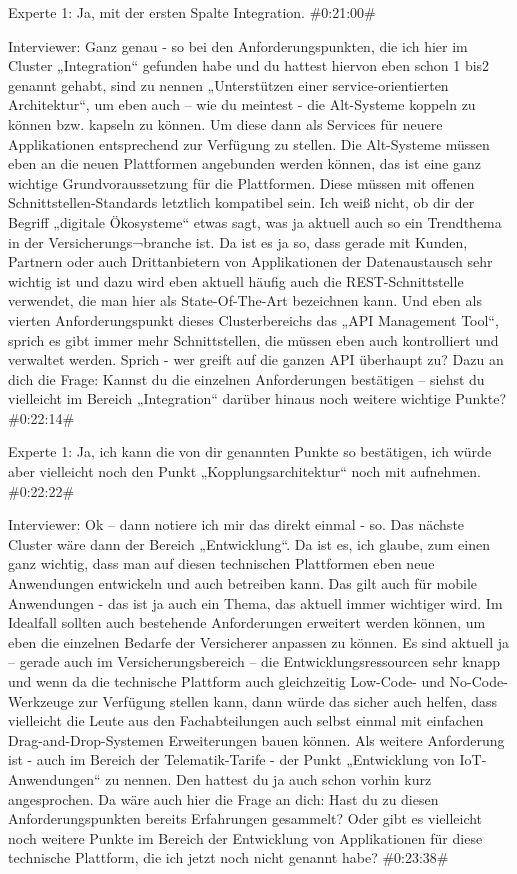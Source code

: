 Experte 1:
Ja, mit der ersten Spalte Integration.
\#0:21:00\#

Interviewer:
Ganz genau - so bei den Anforderungspunkten, die ich hier im Cluster „Integration“ gefunden habe und du hattest hiervon eben schon 1 bis2 genannt gehabt, sind zu nennen „Unterstützen einer service-orientierten Architektur“, um eben auch – wie du meintest - die Alt-Systeme koppeln zu können bzw. kapseln zu können.  Um diese dann als Services für neuere Applikationen entsprechend zur Verfügung zu stellen. Die Alt-Systeme müssen eben an die neuen Plattformen angebunden werden können, das ist eine ganz wichtige Grundvoraussetzung für die Plattformen. Diese müssen mit offenen Schnittstellen-Standards letztlich kompatibel sein. Ich weiß nicht, ob dir der Begriff „digitale Ökosysteme“ etwas sagt, was ja aktuell auch so ein Trendthema in der Versicherungs¬branche ist. Da ist es ja so, dass gerade mit Kunden, Partnern oder auch Drittanbietern von Applikationen der Datenaustausch sehr wichtig ist und dazu wird eben aktuell häufig auch die REST-Schnittstelle verwendet, die man hier als State-Of-The-Art bezeichnen kann. Und eben als vierten Anforderungspunkt dieses Clusterbereichs das „API Management Tool“, sprich es gibt immer mehr Schnittstellen, die müssen eben auch kontrolliert und verwaltet werden. Sprich - wer greift auf die ganzen API überhaupt zu? Dazu an dich die Frage: Kannst du die einzelnen Anforderungen bestätigen – siehst du vielleicht im Bereich „Integration“ darüber hinaus noch weitere wichtige Punkte?
\#0:22:14\#

Experte 1:
Ja, ich kann die von dir genannten Punkte so bestätigen, ich würde aber vielleicht noch den Punkt „Kopplungsarchitektur“ noch mit aufnehmen.
\#0:22:22\#

Interviewer:
Ok – dann notiere ich mir das direkt einmal - so. Das nächste Cluster wäre dann der Bereich „Entwicklung“. Da ist es, ich glaube, zum einen ganz wichtig, dass man auf diesen technischen Plattformen eben neue Anwendungen entwickeln und auch betreiben kann. Das gilt auch für mobile Anwendungen - das ist ja auch ein Thema, das aktuell immer wichtiger wird. Im Idealfall sollten auch bestehende Anforderungen erweitert werden können, um eben die einzelnen Bedarfe der Versicherer anpassen zu können. Es sind aktuell ja – gerade auch im Versicherungsbereich – die Entwicklungsressourcen sehr knapp und wenn da die technische Plattform auch gleichzeitig Low-Code- und No-Code-Werkzeuge zur Verfügung stellen kann, dann würde das sicher auch helfen, dass vielleicht die Leute aus den Fachabteilungen auch selbst einmal mit einfachen Drag-and-Drop-Systemen Erweiterungen bauen können. Als weitere Anforderung ist - auch im Bereich der Telematik-Tarife - der Punkt „Entwicklung von IoT-Anwendungen“ zu nennen. Den hattest du ja auch schon vorhin kurz angesprochen. Da wäre auch hier die Frage an dich: Hast du zu diesen Anforderungspunkten bereits Erfahrungen gesammelt? Oder gibt es vielleicht noch weitere Punkte im Bereich der Entwicklung von Applikationen für diese technische Plattform, die ich jetzt noch nicht genannt habe?
\#0:23:38\#

